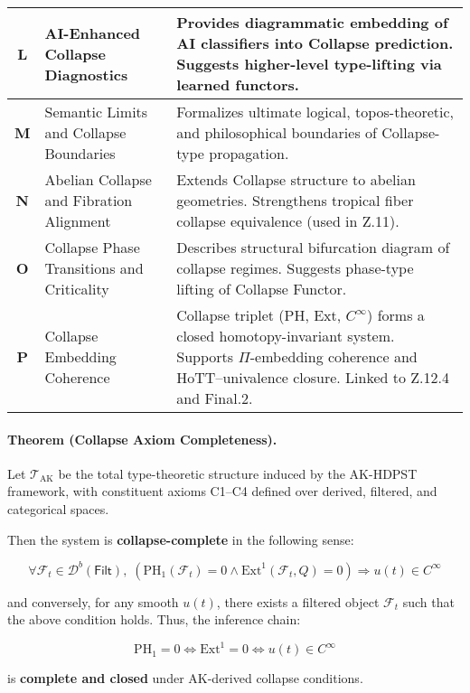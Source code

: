 \documentclass[11pt]{article}
\begin{document}
\begin{axiom}
\begin{axiom}
{{\begin{longtable}{|c|p{5.2cm}|p{7.5cm}|}
\hline
\textbf{L} & AI-Enhanced Collapse Diagnostics & Provides diagrammatic embedding of AI classifiers into Collapse prediction. Suggests higher-level type-lifting via learned functors. \\
\hline
\textbf{M} & Semantic Limits and Collapse Boundaries & Formalizes ultimate logical, topos-theoretic, and philosophical boundaries of Collapse-type propagation. \\
\hline
\textbf{N} & Abelian Collapse and Fibration Alignment & Extends Collapse structure to abelian geometries. Strengthens tropical fiber collapse equivalence (used in Z.11). \\
\hline
\textbf{O} & Collapse Phase Transitions and Criticality & Describes structural bifurcation diagram of collapse regimes. Suggests phase-type lifting of Collapse Functor. \\
\hline
\textbf{P} & Collapse Embedding Coherence & Collapse triplet (PH, Ext, \(C^\infty\)) forms a closed homotopy-invariant system. Supports \(\Pi\)-embedding coherence and HoTT–univalence closure. Linked to Z.12.4 and Final.2. \\
\hline
\end{longtable}



\paragraph{Theorem (Collapse Axiom Completeness).}

Let \( \mathcal{T}_{\text{AK}} \) be the total type-theoretic structure induced by the AK-HDPST framework,  
with constituent axioms C1–C4 defined over derived, filtered, and categorical spaces.

Then the system is \textbf{collapse-complete} in the following sense:

\[
\forall \mathcal{F}_t \in \mathcal{D}^b(\mathsf{Filt}),\;
\left( \mathrm{PH}_1(\mathcal{F}_t) = 0 \land \mathrm{Ext}^1(\mathcal{F}_t, Q) = 0 \right)
\Rightarrow u(t) \in C^\infty
\]

and conversely, for any smooth \( u(t) \), there exists a filtered object \( \mathcal{F}_t \) such that the above condition holds.  
Thus, the inference chain:

\[
\mathrm{PH}_1 = 0 \Leftrightarrow \mathrm{Ext}^1 = 0 \Leftrightarrow u(t) \in C^\infty
\]

is \textbf{complete and closed} under AK-derived collapse conditions.

\vspace{1em}
}}
\end{axiom}
\end{axiom}
\end{document}
